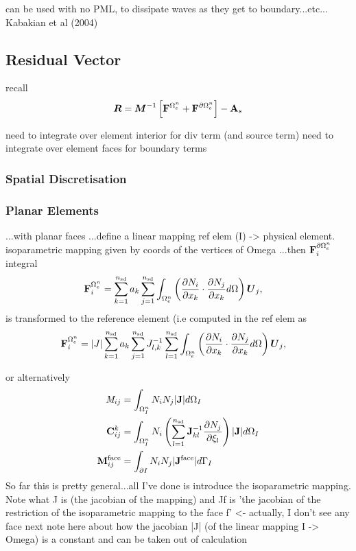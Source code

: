 can be used with no PML, to dissipate waves as they get to boundary...etc...
Kabakian et al (2004)

\subsection{Residual Vector}
recall
$$
\boldsymbol{R} = \boldsymbol{M}^{-1} \left[  \mathbf{F}^{\Omega_e^{n}} + \mathbf{F}^{\partial \Omega_e^{n}} \right] - \mathbf{A}_s
$$

need to integrate over element interior for div term (and source term)
need to integrate over element faces for boundary terms


\subsubsection{Spatial Discretisation}
  
\subsubsection{Planar Elements}

...with planar faces
...define a linear mapping ref elem (I) -> physical element.
isoparametric mapping given by coords of the vertices of Omega
...then $\mathbf{F}^{\partial \Omega_e^{n}}_{i}$ integral 
\begin{align*}
\mathbf{F}^{\Omega_e^{n}}_{i} &=  \sum_{k=1}^{n_\textrm{sd}} a_k \sum_{j=1}^{n_\textrm{sd}} \int_{\Omega_e^{n}} \left( \frac{\partial N_i}{\partial x_{k}} \cdot \frac{\partial N_j}{\partial x_{k}} d\Omega \right) \boldsymbol{U}_j ,
\end{align*}
is transformed to the reference element (i.e computed in the ref elem as
\begin{align*}
\mathbf{F}^{\Omega_e^{n}}_{i} &= |J| \sum_{k=1}^{n_\textrm{sd}} a_k \sum_{j=1}^{n_\textrm{sd}} J_{l,k}^{-1} \sum_{l=1}^{n_\textrm{sd}}\int_{\Omega_e^{n}} \left( \frac{\partial N_i}{\partial x_{k}} \cdot \frac{\partial N_j}{\partial x_{k}} d\Omega \right) \boldsymbol{U}_j ,
\end{align*}

or alternatively
\begin{align*}
\mathit{M}_{ij} &= \int_{\Omega^{n}_{I}} N_i N_j |\mathbf{J}| d\Omega_{I} \\
\mathbf{C}^{k}_{ij} &= \int_{\Omega^{n}_{I}} N_i
                             \left(
                               \sum_{l=1}^{n_\textrm{sd}}
                               \mathbf{J}_{kl}^{-1}
                               \frac{\partial N_j}{\partial \xi_{l}}
                             \right)
                             |\mathbf{J}|
                             d\Omega_{I}
  \\
\mathbf{M}^{\textrm{face}}_{ij} &= \int_{\partial I} N_i N_j |\mathbf{J}^{\textrm{face}}|
  d\Gamma_{I}
\end{align*}
So far this is pretty general...all I've done is introduce the isoparametric mapping.
Note what J is (the jacobian of the mapping) and Jf is 'the jacobian of the
restriction of the isoparametric mapping to the face f' <- actually, I don't see
any face
next note here about how the jacobian |J| (of the linear mapping I -> Omega) is a constant
and can be taken out of calculation

